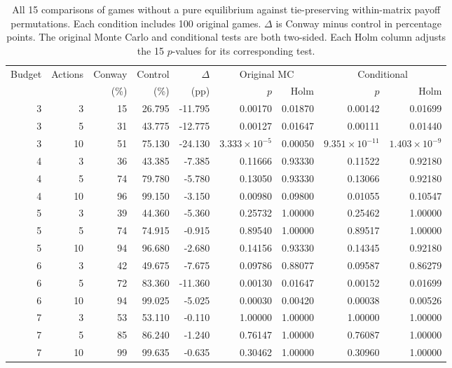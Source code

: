 \documentclass[games,article,submit,moreauthors]{Definitions/mdpi}
\begin{document}
\begin{table}[H]
\centering
\caption{All 15 comparisons of games without a pure equilibrium against tie-preserving within-matrix payoff permutations. Each condition includes 100 original games. $\Delta$ is Conway minus control in percentage points. The original Monte Carlo and conditional tests are both two-sided. Each Holm column adjusts the 15 $p$-values for its corresponding test.}
\label{tab:permutation}
\small
\setlength{\tabcolsep}{3pt}
\begin{tabular}{@{}rrrrrrrrr@{}}
\toprule
Budget & Actions & Conway & Control & $\Delta$ & \multicolumn{2}{c}{Original MC} & \multicolumn{2}{c}{Conditional} \\
 & & (\%) & (\%) & (pp) & $p$ & Holm & $p$ & Holm \\
\midrule
3 & 3 & 15 & 26.795 & -11.795 & 0.00170 & 0.01870 & 0.00142 & 0.01699 \\
3 & 5 & 31 & 43.775 & -12.775 & 0.00127 & 0.01647 & 0.00111 & 0.01440 \\
3 & 10 & 51 & 75.130 & -24.130 & $3.333\times10^{-5}$ & 0.00050 & $9.351\times10^{-11}$ & $1.403\times10^{-9}$ \\
4 & 3 & 36 & 43.385 & -7.385 & 0.11666 & 0.93330 & 0.11522 & 0.92180 \\
4 & 5 & 74 & 79.780 & -5.780 & 0.13050 & 0.93330 & 0.13066 & 0.92180 \\
4 & 10 & 96 & 99.150 & -3.150 & 0.00980 & 0.09800 & 0.01055 & 0.10547 \\
5 & 3 & 39 & 44.360 & -5.360 & 0.25732 & 1.00000 & 0.25462 & 1.00000 \\
5 & 5 & 74 & 74.915 & -0.915 & 0.89540 & 1.00000 & 0.89517 & 1.00000 \\
5 & 10 & 94 & 96.680 & -2.680 & 0.14156 & 0.93330 & 0.14345 & 0.92180 \\
6 & 3 & 42 & 49.675 & -7.675 & 0.09786 & 0.88077 & 0.09587 & 0.86279 \\
6 & 5 & 72 & 83.360 & -11.360 & 0.00130 & 0.01647 & 0.00152 & 0.01699 \\
6 & 10 & 94 & 99.025 & -5.025 & 0.00030 & 0.00420 & 0.00038 & 0.00526 \\
7 & 3 & 53 & 53.110 & -0.110 & 1.00000 & 1.00000 & 1.00000 & 1.00000 \\
7 & 5 & 85 & 86.240 & -1.240 & 0.76147 & 1.00000 & 0.76087 & 1.00000 \\
7 & 10 & 99 & 99.635 & -0.635 & 0.30462 & 1.00000 & 0.30960 & 1.00000 \\
\bottomrule
\end{tabular}
\end{table}
\end{document}
